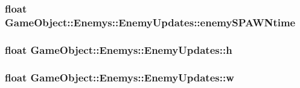 \subsubsection[{\texorpdfstring{enemy\+S\+P\+A\+W\+Ntime}{enemySPAWNtime}}]{\setlength{\rightskip}{0pt plus 5cm}float Game\+Object\+::\+Enemys\+::\+Enemy\+Updates\+::enemy\+S\+P\+A\+W\+Ntime}\hypertarget{classGameObject_1_1Enemys_1_1EnemyUpdates_ae9de980bafa27f9cd53a3ed09ed1a1b2}{}\label{classGameObject_1_1Enemys_1_1EnemyUpdates_ae9de980bafa27f9cd53a3ed09ed1a1b2}
\subsubsection[{\texorpdfstring{h}{h}}]{\setlength{\rightskip}{0pt plus 5cm}float Game\+Object\+::\+Enemys\+::\+Enemy\+Updates\+::h}\hypertarget{classGameObject_1_1Enemys_1_1EnemyUpdates_acfe6d4eef800ac30a8ae7b5f42b8553c}{}\label{classGameObject_1_1Enemys_1_1EnemyUpdates_acfe6d4eef800ac30a8ae7b5f42b8553c}
\subsubsection[{\texorpdfstring{w}{w}}]{\setlength{\rightskip}{0pt plus 5cm}float Game\+Object\+::\+Enemys\+::\+Enemy\+Updates\+::w}\hypertarget{classGameObject_1_1Enemys_1_1EnemyUpdates_a02597f023815942af2e28ed6a3bf0c74}{}\label{classGameObject_1_1Enemys_1_1EnemyUpdates_a02597f023815942af2e28ed6a3bf0c74}
